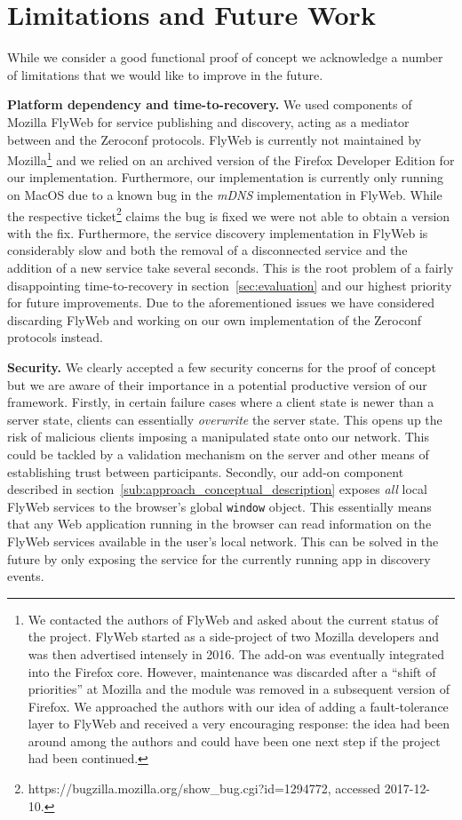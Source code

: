 \section{Limitations and Future Work}
\label{sec:limitations_and_future_work}

While we consider \APIName a good functional proof of concept we acknowledge a number of limitations that we would like to improve in the future.

\textbf{Platform dependency and time-to-recovery.}
We used components of Mozilla FlyWeb for service publishing and discovery, acting as a mediator between \APIshort and the Zeroconf protocols.
FlyWeb is currently not maintained by Mozilla\footnote{We contacted the authors of FlyWeb and asked about the current status of the project. FlyWeb started as a side-project of two Mozilla developers and was then advertised intensely in 2016. 
The add-on was eventually integrated into the Firefox core. However, maintenance was discarded after a ``shift of priorities'' at Mozilla and the module was removed in a subsequent version of Firefox. 
We approached the authors with our idea of adding a fault-tolerance layer to FlyWeb and received a very encouraging response: the idea had been around among the authors and could have been one next step if the project had been continued.} and we relied on an archived version of the Firefox Developer Edition for our implementation. 
Furthermore, our implementation is currently only running on MacOS due to a known bug in the \textit{mDNS} implementation in FlyWeb. 
While the respective ticket\footnote{https://bugzilla.mozilla.org/show\_bug.cgi?id=1294772, accessed 2017-12-10.} claims the bug is fixed we were not able to obtain a version with the fix. 
Furthermore, the service discovery implementation in FlyWeb is considerably slow and both the removal of a disconnected service and the addition of a new service take several seconds. 
This is the root problem of a fairly disappointing time-to-recovery in section~\ref{sec:evaluation} and our highest priority for future improvements. 
Due to the aforementioned issues we have considered discarding FlyWeb and working on our own implementation of the Zeroconf protocols instead.

\textbf{Security.}
We clearly accepted a few security concerns for the \APIName proof of concept but we are aware of their importance in a potential productive version of our framework. Firstly, in certain failure cases where a client state is newer than a server state, clients can essentially \textit{overwrite} the server state. This opens up the risk of malicious clients imposing a manipulated state onto our network. This could be tackled by a validation mechanism on the server and other means of establishing trust between participants. Secondly, our add-on component described in section~\ref{sub:approach_conceptual_description} exposes \textit{all} local FlyWeb services to the browser's global \texttt{window} object. This essentially means that any Web application running in the browser can read information on the FlyWeb services available in the user's local network. This can be solved in the future by only exposing the service for the currently running app in discovery events.

